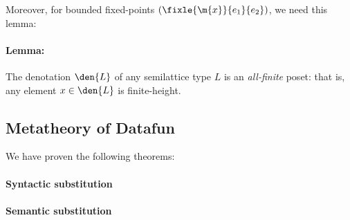Moreover, for bounded fixed-points $(\fixle{\m{x}}{e_1}{e_2})$, we need this
lemma:

\paragraph{Lemma:}
The denotation $\den{L}$ of any semilattice type $L$ is an \emph{all-finite}
poset: that is, any element $x \in \den{L}$ is finite-height.




\subsection{Metatheory of Datafun}


We have proven the following theorems:

\paragraph{Syntactic substitution} 
\paragraph{Semantic substitution} 

\paragraph{}
